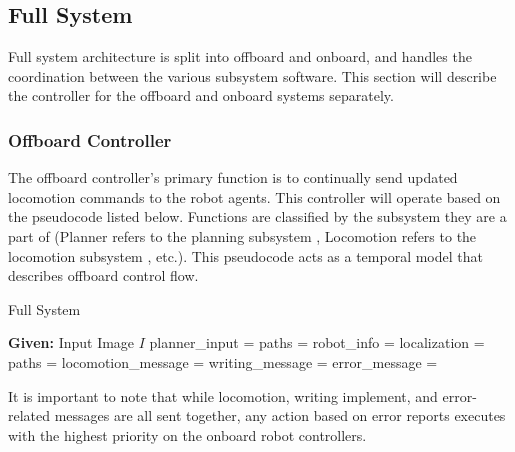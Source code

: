 
\subsection{Full System}
\label{sec:software_full_system}

Full system architecture is split into offboard and onboard, and handles the coordination between the various subsystem software. This section will describe the controller for the offboard and onboard systems separately.

\subsubsection{Offboard Controller}
\label{sec:software_full_offboard}

The offboard controller's primary function is to continually send updated locomotion commands to the robot agents. This controller will operate based on the pseudocode listed below. Functions are classified by the subsystem they are a part of (Planner refers to the planning subsystem , Locomotion refers to the locomotion subsystem , etc.). This pseudocode acts as a temporal model that describes offboard control flow.

\begin{algorithm}[t!]
\caption{Full System}\label{algo:full_system}
\begin{algorithmic}[1]
\State \textbf{Given:} Input Image $I$
\State planner\_input = 
\State paths = 
\State {}
    \State robot\_info = 
    \State localization = 
   \State paths = 
   \State locomotion\_message = 
   \State writing\_message = 
   \State error\_message = 
   \State {}
   \State {}
\EndProcedure
\end{algorithmic}
\end{algorithm}

It is important to note that while locomotion, writing implement, and error-related messages are all sent together, any action based on error reports executes with the highest priority on the onboard robot controllers.

